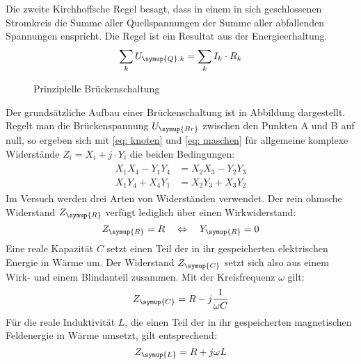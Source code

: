 Die zweite Kirchhoffsche Regel besagt, dass in einem in sich geschlossenen Stromkreis
die Summe aller Quellspannungen der Summe aller abfallenden
Spannungen enspricht. Die Regel ist ein Resultat aus der Energieerhaltung.
\begin{equation}
  \sum_k U_{\symup{Q},k} = \sum_k I_k \cdot R_k
  \label{eq: maschen}
\end{equation}
\begin{figure}
  \centering
  \caption{Prinzipielle Brückenschaltung\cite{anleitung302}}
  \label{fig: prinzbrücke}
\end{figure}
Der grundsätzliche Aufbau einer Brückenschaltung ist in Abbildung  dargestellt. Regelt man die Brückenspannung $U_{\symup{Br}}$
zwischen den Punkten A und B auf null, so ergeben sich mit \eqref{eq: knoten} und \eqref{eq: maschen}
für allgemeine komplexe Widerstände $Z_i = X_i + j \cdot Y_i$ die
beiden Bedingungen:
\begin{align}
  \begin{aligned}
    X_1 X_4 - Y_1 Y_4 &= X_2 X_3 - Y_2 Y_3 \\
    X_1 Y_4 + X_4 Y_1 &= X_2 Y_3 + X_3 Y_2
  \end{aligned}
  \label{eq: widerstandsbedingungen}
\end{align}
Im Versuch werden drei Arten von Widerständen verwendet. Der rein ohmsche Widerstand
$Z_{\symup{R}}$ verfügt lediglich über einen Wirkwiderstand:
\begin{equation}
 Z_{\symup{R}} = R \quad \Leftrightarrow \quad Y_{\symup{R}} = 0
\end{equation}
Eine reale Kapazität $C$ setzt einen Teil der in ihr gespeicherten elektrischen Energie
in Wärme um. Der Widerstand $Z_{\symup{C}}$ setzt sich also aus einem Wirk- und einem Blindanteil zusammen. Mit der Kreisfrequenz $\omega$ gilt:
\begin{equation}
  Z_{\symup{C}} = R - j \frac{1}{\omega C}
\end{equation}
Für die reale Induktivität $L$, die einen Teil der in ihr
gespeicherten magnetischen Feldenergie in Wärme umsetzt, gilt entsprechend:
\begin{equation}
  Z_{\symup{L}} = R + j \omega L
\end{equation} 
